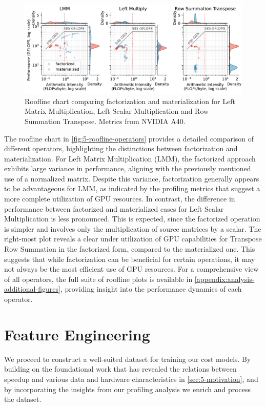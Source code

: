\begin{figure}[ht]
    \centering
    \includegraphics[width=\linewidth]{chapters/05_cost_estimation/figures/roofline-operators.pdf}
    \caption[Roofline chart per operator]{Roofline chart comparing factorization and materialization for Left Matrix Multiplication, Left Scalar Multiplication and Row Summation Transpose. Metrics from NVIDIA A40.}
    \label{fig:5-roofline-operators}
\end{figure}

The roofline chart in \autoref{fig:5-roofline-operators} provides a detailed comparison of different operators, highlighting the distinctions between factorization and materialization. For Left Matrix Multiplication (LMM), the factorized approach exhibits large variance in performance, aligning with the previously mentioned use of a normalized matrix. Despite this variance, factorization generally appears to be advantageous for LMM, as indicated by the profiling metrics that suggest a more complete utilization of GPU resources. In contrast, the difference in performance between factorized and materialized cases for Left Scalar Multiplication is less pronounced. This is expected, since the factorized operation is simpler and involves only the multiplication of source matrices by a scalar. The right-most plot reveals a clear under utilization of GPU capabilities for Transpose Row Summation in the factorized form, compared to the materialized one. This suggests that while factorization can be beneficial for certain operations, it may not always be the most efficient use of GPU resources. For a comprehensive view of all operators, the full suite of roofline plots is available in \autoref{appendix:analysis-additional-figures}, providing insight into the performance dynamics of each operator.

\section{Feature Engineering}
\label{sec:5-feature-engineering}
We proceed to construct a well-suited dataset for training our cost models. By building on the foundational work that has revealed the relations between speedup and various data and hardware characteristics in \autoref{sec:5-motivation}, and by incorporating the insights from our profiling analysis we enrich and process the dataset.

